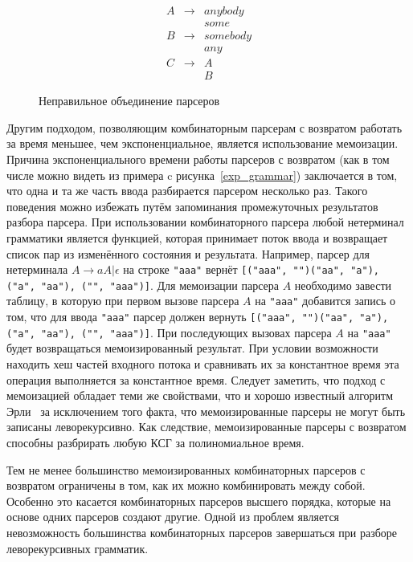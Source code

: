 \documentclass[times]{itmo-student-thesis}
\begin{document}
\begin{figure}[!h]
    \caption{Неправильное объединение парсеров}\label{uncomposable_grammar}
    \[
        \begin{array}{lll}
            A & \to & anybody \\
              &     & some  \\
            B & \to & somebody \\
              &     & any  \\
            C & \to & A  \\
              &     & B
        \end{array}
    \]
\end{figure}

Другим подходом, позволяющим комбинаторным парсерам с возвратом работать за время меньшее, чем экспоненциальное,
является использование мемоизации. Причина экспоненциального времени работы парсеров с возвратом (как в том числе
можно видеть из примера c рисунка~\ref{exp_grammar}) заключается в том, что одна и та же часть ввода разбирается
парсером несколько раз. Такого поведения можно избежать путём запоминания промежуточных результатов разбора парсера.
При использовании комбинаторного парсера любой нетерминал грамматики является функцией, которая принимает поток ввода и
возвращает список пар из изменённого состояния и результата. Например, парсер для нетерминала $A \to aA | \epsilon$ на
строке \lstinline{"aaa"} вернёт \lstinline{[("aaa", "")("aa", "a"), ("a", "aa"), ("", "aaa")]}. Для мемоизации парсера
$A$ необходимо завести таблицу, в которую при первом вызове парсера $A$ на
\lstinline{"aaa"} добавится запись о том, что для ввода \lstinline{"aaa"} парсер должен вернуть
\lstinline{[("aaa", "")("aa", "a"), ("a", "aa"), ("", "aaa")]}. При последующих вызовах парсера $A$ на \lstinline{"aaa"}
будет возвращаться мемоизированный результат. При условии возможности находить хеш частей входного потока и сравнивать
их за константное время эта операция выполняется за константное время. Следует заметить, что подход с мемоизацией
обладает теми же свойствами, что и хорошо известный алгоритм Эрли~\cite{earley_efficient_1970, norvig_techniques_1991} 
за исключением того факта, что мемоизированные парсеры не могут быть записаны леворекурсивно. Как следствие,
мемоизированные парсеры с возвратом способны разбрирать любую КСГ за полиномиальное время.

Тем не менее большинство мемоизированных комбинаторных парсеров с возвратом ограничены в том, как их можно
комбинировать между собой. Особенно это касается комбинаторных парсеров высшего порядка, которые на основе одних
парсеров создают другие. Одной из проблем является невозможность большинства комбинаторных парсеров завершаться при
разборе леворекурсивных грамматик.
\end{document}

